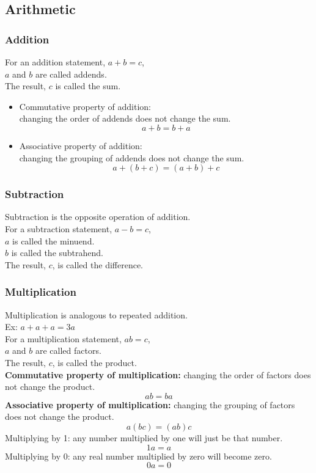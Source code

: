 \subsection{Arithmetic}

\subsubsection{Addition}
For an addition statement, $a+b=c$,\\
$a$ and $b$ are called addends.\\
The result, $c$ is called the sum.
\begin{itemize}
    \item Commutative property of addition:\\
    changing the order of addends does not change the sum.
    $$a+b=b+a$$
    \item Associative property of addition:\\
    changing the grouping of addends does not change the sum.
    $$a+(b+c)=(a+b)+c$$
\end{itemize}



\subsubsection{Subtraction}
Subtraction is the opposite operation of addition.\\
For a subtraction statement, $a-b=c$,\\
$a$ is called the minuend.\\
$b$ is called the subtrahend.\\
The result, $c$, is called the difference.

\subsubsection{Multiplication}
Multiplication is analogous to repeated addition.\\
Ex: $a+a+a=3a$\\
For a multiplication statement, $ab=c$,\\
$a$ and $b$ are called factors.\\
The result, $c$, is called the product.\\
\textbf{Commutative property of multiplication:} changing the order of factors does not change the product.
$$ab=ba$$
\textbf{Associative property of multiplication:} changing the grouping of factors does not change the product.
$$a(bc)=(ab)c$$
Multiplying by 1: any number multiplied by one will just be that number.
$$1a=a$$
Multiplying by 0: any real number multiplied by zero will become zero.
$$0a=0$$

